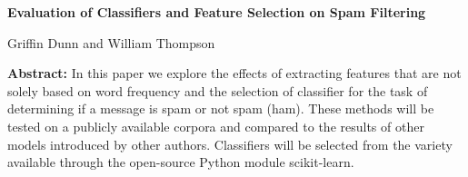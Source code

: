 \documentclass[12pt]{article}
\begin{document}
    \begin{center}
        \textbf{Evaluation of Classifiers and Feature Selection on Spam Filtering} 
    \end{center}

    \begin{center}
        Griffin Dunn and William Thompson
    \end{center}

    \textbf{Abstract:} 
        In this paper we explore the effects of extracting features that are not 
        solely based on word frequency and the selection of classifier for the task
        of determining if a message is spam or not spam (ham). These methods
        will be tested on a publicly available corpora and compared to the results
        of other models introduced by other authors. Classifiers will be selected
        from the variety available through the open-source Python module scikit-learn.
\end{document}
